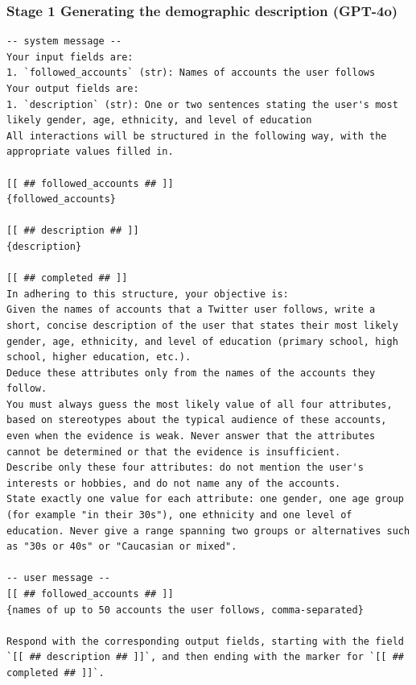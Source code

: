 \documentclass[10pt]{article}
\begin{document}
\subsubsection*{Stage 1 \textperiodcentered{} Generating the demographic description (GPT-4o)}
\begin{Verbatim}[breaklines,breakanywhere,fontsize=\footnotesize]
-- system message --
Your input fields are:
1. `followed_accounts` (str): Names of accounts the user follows
Your output fields are:
1. `description` (str): One or two sentences stating the user's most likely gender, age, ethnicity, and level of education
All interactions will be structured in the following way, with the appropriate values filled in.

[[ ## followed_accounts ## ]]
{followed_accounts}

[[ ## description ## ]]
{description}

[[ ## completed ## ]]
In adhering to this structure, your objective is: 
Given the names of accounts that a Twitter user follows, write a short, concise description of the user that states their most likely gender, age, ethnicity, and level of education (primary school, high school, higher education, etc.).
Deduce these attributes only from the names of the accounts they follow.
You must always guess the most likely value of all four attributes, based on stereotypes about the typical audience of these accounts, even when the evidence is weak. Never answer that the attributes cannot be determined or that the evidence is insufficient.
Describe only these four attributes: do not mention the user's interests or hobbies, and do not name any of the accounts.
State exactly one value for each attribute: one gender, one age group (for example "in their 30s"), one ethnicity and one level of education. Never give a range spanning two groups or alternatives such as "30s or 40s" or "Caucasian or mixed".

-- user message --
[[ ## followed_accounts ## ]]
{names of up to 50 accounts the user follows, comma-separated}

Respond with the corresponding output fields, starting with the field `[[ ## description ## ]]`, and then ending with the marker for `[[ ## completed ## ]]`.
\end{Verbatim}
\end{document}
